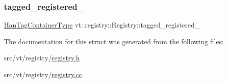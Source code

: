 \subsubsection{\texorpdfstring{tagged\+\_\+registered\+\_\+}{tagged\_registered\_}}
{\footnotesize\ttfamily \hyperlink{structvt_1_1registry_1_1_registry_ab5d336044aee749d39c8feabe4fa6983}{Han\+Tag\+Container\+Type} vt\+::registry\+::\+Registry\+::tagged\+\_\+registered\+\_\+\hspace{0.3cm}{\ttfamily [private]}}



The documentation for this struct was generated from the following files\+:\begin{DoxyCompactItemize}
\item 
src/vt/registry/\hyperlink{registry_2registry_8h}{registry.\+h}\item 
src/vt/registry/\hyperlink{registry_8cc}{registry.\+cc}\end{DoxyCompactItemize}

